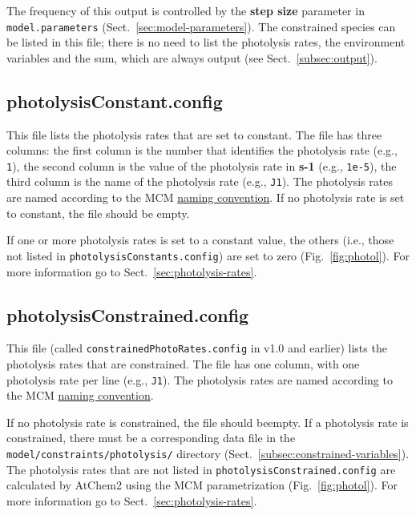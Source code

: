 The frequency of this output is controlled by the \textbf{step size}
parameter in \texttt{model.parameters} (Sect.~\ref{sec:model-parameters}).
The constrained species can be listed in this file; there is no need
to list the photolysis rates, the environment variables and the
 sum, which are always output (see Sect.~\ref{subsec:output}).

\subsection{photolysisConstant.config} \label{subsec:photolysisconstant}

This file lists the photolysis rates that are set to constant. The file has
three columns: the first column is the number that identifies the
photolysis rate (e.g., \texttt{1}), the second column is the value of
the photolysis rate in \textbf{s-1} (e.g., \texttt{1e-5}), the third
column is the name of the photolysis rate (e.g., \texttt{J1}). The
photolysis rates are named according to the MCM
\href{http://mcm.leeds.ac.uk/MCM/parameters/photolysis.htt}{naming convention}.
If no photolysis rate is set to constant, the file should be empty.

If one or more photolysis rates is set to a constant value, the others
(i.e., those not listed in \texttt{photolysisConstants.config}) are
set to zero (Fig.~\ref{fig:photol}). For more information go to
Sect.~\ref{sec:photolysis-rates}.

\subsection{photolysisConstrained.config} \label{subsec:photolysisconstrained}

This file (called \texttt{constrainedPhotoRates.config} in v1.0 and
earlier) lists the photolysis rates that are constrained. The file has
one column, with one photolysis rate per line (e.g., \texttt{J1}). The
photolysis rates are named according to the MCM
\href{http://mcm.leeds.ac.uk/MCM/parameters/photolysis.htt}{naming convention}.

If no photolysis rate is constrained, the file should beempty. If a
photolysis rate is constrained, there must be a corresponding data
file in the \texttt{model/constraints/photolysis/} directory
(Sect.~\ref{subsec:constrained-variables}). The photolysis rates that
are not listed in \texttt{photolysisConstrained.config} are calculated
by AtChem2 using the MCM parametrization (Fig.~\ref{fig:photol}). For
more information go to Sect.~\ref{sec:photolysis-rates}.

